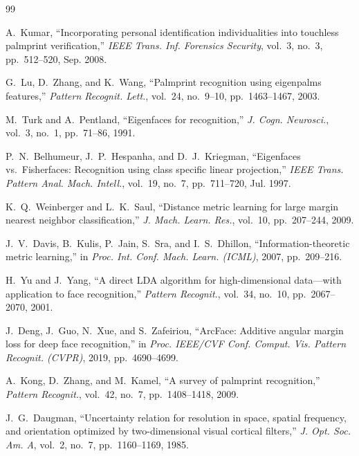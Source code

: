 \documentclass[conference]{IEEEtran}
\begin{document}
\begin{thebibliography}{99}

A.~Kumar, ``Incorporating personal identification individualities into touchless palmprint verification,'' \emph{IEEE Trans. Inf. Forensics Security}, vol.~3, no.~3, pp.~512--520, Sep. 2008.

G.~Lu, D.~Zhang, and K.~Wang, ``Palmprint recognition using eigenpalms features,'' \emph{Pattern Recognit. Lett.}, vol.~24, no.~9--10, pp.~1463--1467, 2003.

M.~Turk and A.~Pentland, ``Eigenfaces for recognition,'' \emph{J. Cogn. Neurosci.}, vol.~3, no.~1, pp.~71--86, 1991.

P.~N.~Belhumeur, J.~P.~Hespanha, and D.~J.~Kriegman, ``Eigenfaces vs.\ Fisherfaces: Recognition using class specific linear projection,'' \emph{IEEE Trans. Pattern Anal. Mach. Intell.}, vol.~19, no.~7, pp.~711--720, Jul. 1997.

K.~Q.~Weinberger and L.~K.~Saul, ``Distance metric learning for large margin nearest neighbor classification,'' \emph{J. Mach. Learn. Res.}, vol.~10, pp.~207--244, 2009.

J.~V.~Davis, B.~Kulis, P.~Jain, S.~Sra, and I.~S.~Dhillon, ``Information-theoretic metric learning,'' in \emph{Proc. Int. Conf. Mach. Learn. (ICML)}, 2007, pp.~209--216.

H.~Yu and J.~Yang, ``A direct LDA algorithm for high-dimensional data---with application to face recognition,'' \emph{Pattern Recognit.}, vol.~34, no.~10, pp.~2067--2070, 2001.

J.~Deng, J.~Guo, N.~Xue, and S.~Zafeiriou, ``ArcFace: Additive angular margin loss for deep face recognition,'' in \emph{Proc. IEEE/CVF Conf. Comput. Vis. Pattern Recognit. (CVPR)}, 2019, pp.~4690--4699.

A.~Kong, D.~Zhang, and M.~Kamel, ``A survey of palmprint recognition,'' \emph{Pattern Recognit.}, vol.~42, no.~7, pp.~1408--1418, 2009.

J.~G.~Daugman, ``Uncertainty relation for resolution in space, spatial frequency, and orientation optimized by two-dimensional visual cortical filters,'' \emph{J. Opt. Soc. Am. A}, vol.~2, no.~7, pp.~1160--1169, 1985.

\end{thebibliography}

\balance
\end{document}
